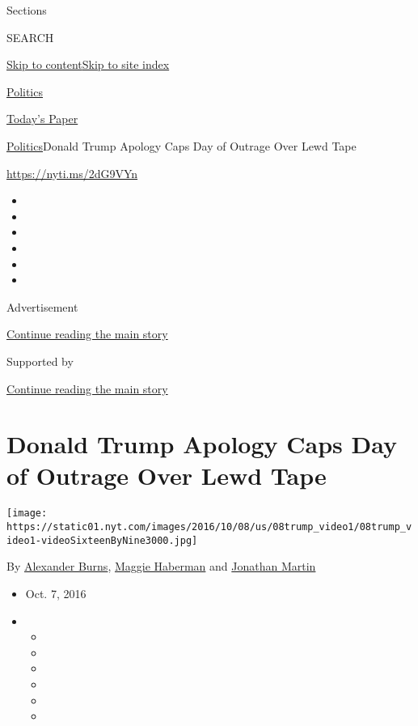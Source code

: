 Sections

SEARCH

\protect\hyperlink{site-content}{Skip to
content}\protect\hyperlink{site-index}{Skip to site index}

\href{https://www.nytimes.com/section/politics}{Politics}

\href{https://myaccount.nytimes.com/auth/login?response_type=cookie\&client_id=vi}{}

\href{https://www.nytimes.com/section/todayspaper}{Today's Paper}

\href{/section/politics}{Politics}\textbar{}Donald Trump Apology Caps
Day of Outrage Over Lewd Tape

\url{https://nyti.ms/2dG9VYn}

\begin{itemize}
\item
\item
\item
\item
\item
\item
\end{itemize}

Advertisement

\protect\hyperlink{after-top}{Continue reading the main story}

Supported by

\protect\hyperlink{after-sponsor}{Continue reading the main story}

\hypertarget{donald-trump-apology-caps-day-of-outrage-over-lewd-tape}{%
\section{Donald Trump Apology Caps Day of Outrage Over Lewd
Tape}\label{donald-trump-apology-caps-day-of-outrage-over-lewd-tape}}

\texttt{[image: https://static01.nyt.com/images/2016/10/08/us/08trump\_video1/08trump\_video1-videoSixteenByNine3000.jpg]}

By \href{http://www.nytimes.com/by/alexander-burns}{Alexander Burns},
\href{http://www.nytimes.com/by/maggie-haberman}{Maggie Haberman} and
\href{http://www.nytimes.com/by/jonathan-martin}{Jonathan Martin}

\begin{itemize}
\item
  Oct. 7, 2016
\item
  \begin{itemize}
  \item
  \item
  \item
  \item
  \item
  \item
  \end{itemize}
\end{itemize}

